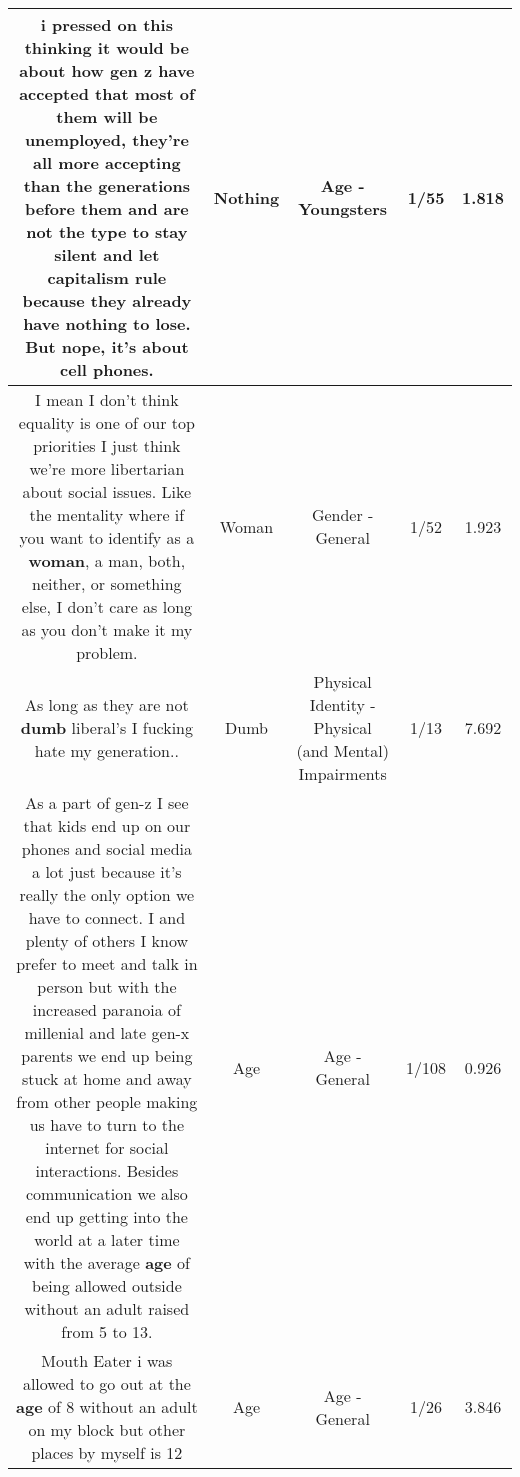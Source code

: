 \documentclass[11pt]{article}
\newlength\mylength
\begin{document}
\begin{center}
\begin{longtable}{|C{.65\mylength}|C{.30\mylength}|C{.12\mylength}|C{.12\mylength}|C{.12\mylength}|}
  \small i pressed on this thinking it would be about how gen z have accepted that most of them will be unemployed, they're all  more accepting than the generations before them and are not the type to stay silent and let capitalism rule because they already have \textbf{nothing} to lose. But nope, it's about cell phones.\normalsize   & Nothing & Age - Youngsters & 1/55 & 1.818 \\  \hline
  \small I mean I don't think equality is one of our top priorities I just think we're more libertarian about social issues. Like the mentality where if you want to identify as a \textbf{woman}, a man, both, neither, or something else, I don't care as long as you don't make it my problem.\normalsize   & Woman & Gender - General & 1/52 & 1.923 \\  \hline
  \small As long as they are not \textbf{dumb} liberal's I fucking hate my generation..\normalsize   & Dumb & Physical Identity - Physical (and Mental) Impairments & 1/13 & 7.692 \\  \hline
  \small As a part of gen-z I see that kids end up on our phones and social media a lot just because it's really the only option we have to connect. I and plenty of others I know prefer to meet and talk in person but with the increased paranoia of millenial and late gen-x parents we end up being stuck at home and away from other people making us have to turn to the internet for social interactions. Besides communication we also end up getting into the world at a later time with the average \textbf{age} of being allowed outside without an adult raised from 5 to 13.\normalsize   & Age & Age - General & 1/108 & 0.926 \\  \hline
  \small Mouth Eater i was allowed to go out at the \textbf{age} of 8 without an adult on my block but other places by myself is 12\normalsize   & Age & Age - General & 1/26 & 3.846 \\  \hline

\end{longtable}
\end{center}
\end{document}
